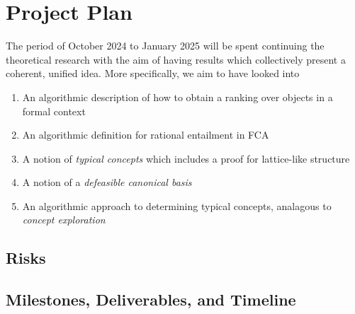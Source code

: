 \clearpage
\section{Project Plan}
\label{section: project plan}
The period of October 2024 to January 2025 will be spent continuing the theoretical research with the aim of having results which collectively present a coherent, unified idea. More specifically, we aim to have looked into
\begin{enumerate}
    \item An algorithmic description of how to obtain a ranking over objects in a formal context
    \item An algorithmic definition for rational entailment in FCA
    \item A notion of \emph{typical concepts} which includes a proof for lattice-like structure
    \item A notion of a \emph{defeasible canonical basis}
    \item An algorithmic approach to determining typical concepts, analagous to \emph{concept exploration}
\end{enumerate}

\subsection{Risks}
\label{subsection: risks}

\subsection{Milestones, Deliverables, and Timeline}
\label{Deliverables and Timeline}

\clearpage
